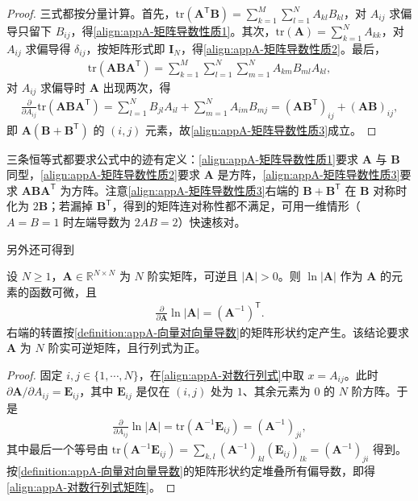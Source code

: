\documentclass[../main.tex]{subfiles}
\begin{document}
\begin{proof}
三式都按分量计算。首先，$\mathrm{tr}(\bm{A}^{\mathsf{T}}\bm{B})=\sum_{k=1}^{M}\sum_{l=1}^{N}A_{kl}B_{kl}$，对 $A_{ij}$ 求偏导只留下 $B_{ij}$，得\eqref{align:appA-矩阵导数性质1}。其次，$\mathrm{tr}(\bm{A})=\sum_{k=1}^{N}A_{kk}$，对 $A_{ij}$ 求偏导得 $\delta_{ij}$，按矩阵形式即 $\bm{I}_{N}$，得\eqref{align:appA-矩阵导数性质2}。最后，
\begin{align*}
 \mathrm{tr}(\bm{A}\bm{B}\bm{A}^{\mathsf{T}})=\sum_{k=1}^{M}\sum_{l=1}^{N}\sum_{m=1}^{N}A_{km}B_{ml}A_{kl},
\end{align*}
对 $A_{ij}$ 求偏导时 $\bm{A}$ 出现两次，得
\begin{align*}
 \frac{\partial}{\partial A_{ij}}\mathrm{tr}(\bm{A}\bm{B}\bm{A}^{\mathsf{T}})=\sum_{l=1}^{N}B_{jl}A_{il}+\sum_{m=1}^{N}A_{im}B_{mj}=(\bm{A}\bm{B}^{\mathsf{T}})_{ij}+(\bm{A}\bm{B})_{ij},
\end{align*}
即 $\bm{A}(\bm{B}+\bm{B}^{\mathsf{T}})$ 的 $(i,j)$ 元素，故\eqref{align:appA-矩阵导数性质3}成立。
\end{proof}

\begin{remark}
三条恒等式都要求公式中的迹有定义：\eqref{align:appA-矩阵导数性质1}要求 $\bm{A}$ 与 $\bm{B}$ 同型，\eqref{align:appA-矩阵导数性质2}要求 $\bm{A}$ 是方阵，\eqref{align:appA-矩阵导数性质3}要求 $\bm{A}\bm{B}\bm{A}^{\mathsf{T}}$ 为方阵。注意\eqref{align:appA-矩阵导数性质3}右端的 $\bm{B}+\bm{B}^{\mathsf{T}}$ 在 $\bm{B}$ 对称时化为 $2\bm{B}$；若漏掉 $\bm{B}^{\mathsf{T}}$，得到的矩阵连对称性都不满足，可用一维情形（$A=B=1$ 时左端导数为 $2AB=2$）快速核对。
\end{remark}

另外还可得到
\begin{proposition}[对数行列式关于矩阵的导数]\label{proposition:appA-对数行列式的矩阵导数}
设 $N\geqslant1$，$\bm{A}\in\mathbb{R}^{N\times N}$ 为 $N$ 阶实矩阵，可逆且 $|\bm{A}|>0$。则 $\ln|\bm{A}|$ 作为 $\bm{A}$ 的元素的函数可微，且
\begin{align}
  \frac{\partial}{\partial\bm{A}}\ln|\bm{A}|=(\bm{A}^{-1})^{\mathsf{T}}.
  \label{align:appA-对数行列式矩阵}
\end{align}
右端的转置按\cref{definition:appA-向量对向量导数}的矩阵形状约定产生。该结论要求 $\bm{A}$ 为 $N$ 阶实可逆矩阵，且行列式为正。
\end{proposition}

\begin{proof}
固定 $i,j\in\{1,\cdots,N\}$，在\eqref{align:appA-对数行列式}中取 $x=A_{ij}$。此时 $\partial\bm{A}/\partial A_{ij}=\bm{E}_{ij}$，其中 $\bm{E}_{ij}$ 是仅在 $(i,j)$ 处为 $1$、其余元素为 $0$ 的 $N$ 阶方阵。于是
\begin{align*}
 \frac{\partial}{\partial A_{ij}}\ln|\bm{A}|=\mathrm{tr}(\bm{A}^{-1}\bm{E}_{ij})=(\bm{A}^{-1})_{ji},
\end{align*}
其中最后一个等号由 $\mathrm{tr}(\bm{A}^{-1}\bm{E}_{ij})=\sum_{k,l}(\bm{A}^{-1})_{kl}(\bm{E}_{ij})_{lk}=(\bm{A}^{-1})_{ji}$ 得到。按\cref{definition:appA-向量对向量导数}的矩阵形状约定堆叠所有偏导数，即得\eqref{align:appA-对数行列式矩阵}。
\end{proof}
\end{document}
